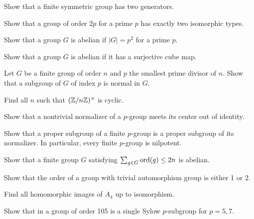 \documentclass[11pt]{article}
\begin{document}
	\begin{prb}
	Show that a finite symmetric group has two generators.
	\end{prb}

	\begin{prb}
	Show that a group of order $2p$ for a prime $p$ has exactly two isomorphic types.
	\end{prb}

	\begin{prb}
	Show that a group $G$ is abelian if $|G|=p^2$ for a prime $p$.
	\end{prb}

	\begin{prb}
	Show that a group $G$ is abelian if it has a surjective cube map.
	\end{prb}

	\begin{prb}
	Let $G$ be a finite group of order $n$ and $p$ the smallest prime divisor of $n$. Show that a subgroup of $G$ of index $p$ is normal in $G$.
	\end{prb}

	\begin{prb}
	Find all $n$ such that $(\mathbb{Z}/n\mathbb{Z})^\times$ is cyclic.
	\end{prb}

	\begin{prb}
	Show that a nontrivial normalizer of a $p$-group meets its center out of identity.
	\end{prb}

	\begin{prb}
	Show that a proper subgroup of a finite $p$-group is a proper subgroup of its normalizer. In particular, every finite $p$-group is nilpotent.
	\end{prb}

	\begin{prb}
	Show that a finite group $G$ satisfying $\sum_{g\in G}\operatorname{ord}(g)\le2n$ is abelian.
	\end{prb}

	\begin{prb}
	Show that the order of a group with trivial automorphism group is either 1 or 2.
	\end{prb}

	\begin{prb}
	Find all homomorphic images of $A_4$ up to isomorphism.
	\end{prb}

	\begin{prb}
	Show that in a group of order 105 is a single Sylow $p$-subgroup for $p=5,7$.
	\end{prb}
\end{document}
